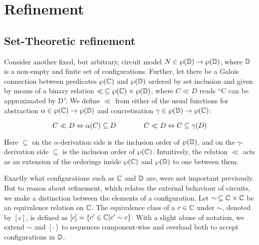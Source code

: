 \section{Refinement}

\subsection{Set-Theoretic refinement}

Consider another fixed, but arbitrary, circuit model $N \in \wp(\mathbb{D}) \rightarrow \wp(\mathbb{D})$, where $\mathbb{D}$ is a non-empty and finite set of configurations. Further, let there be a Galois connection between predicates $\wp(\mathbb{C})$ and $\wp(\mathbb{D})$ ordered by set inclusion and given by means of a binary relation $\ll \, \subseteq \wp(\mathbb{C}) \times \wp(\mathbb{D})$, where $C \ll D$ reads ``C can be approximated by D''. We define $\ll$ from either of the usual functions for abstraction $\alpha \in \wp(\mathbb{C}) \rightarrow \wp(\mathbb{D})$ and concretisation $\gamma \in \wp(\mathbb{D}) \rightarrow \wp(\mathbb{C})$:

\begin{equation*}
C \ll D \Leftrightarrow \alpha(C) \subseteq D \quad\quad\quad\quad C \ll D \Leftrightarrow C \subseteq \gamma(D)
\end{equation*}

\noindent Here $\subseteq$ on the $\alpha$-derivation side is the inclusion order of $\wp(\mathbb{D})$, and on the $\gamma$-derivation side $\subseteq$ is the inclusion order of $\wp(\mathbb{C})$. Intuitively, the relation $\ll$ acts as an extension of the orderings inside $\wp(\mathbb{C})$ and $\wp(\mathbb{D})$ to one between them.


Exactly what configurations such as $\mathbb{C}$ and $\mathbb{D}$ are, were not important previously. But to reason about refinement, which relates the external behaviour of circuits, we make a distinction between the elements of a configuration. Let $\sim \, \subseteq \mathbb{C} \times \mathbb{C}$ be an equivalence relation on $\mathbb{C}$. The equivalence class of a $c \in \mathbb{C}$ under $\sim$, denoted by $[c]$, is defined as $[c] = \{ c' \in \mathbb{C} | c' \sim c \}$.  With a slight abuse of notation, we extend $\sim$ and $[\cdot]$ to sequences component-wise and overload both to accept configurations in $\mathbb{D}$.


